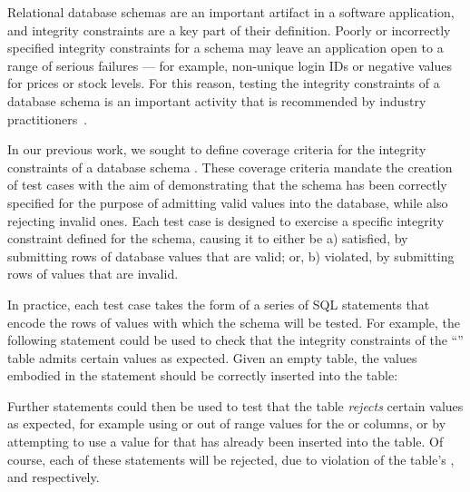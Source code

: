 Relational database schemas are an important artifact in a software application, and integrity constraints are a key part of their definition. Poorly or incorrectly specified integrity constraints for a schema may leave an application open to a range of serious failures --- for example, non-unique login IDs or negative values for prices or stock levels. For this reason, testing the integrity constraints of a database schema is an important activity that is recommended by industry practitioners~\cite{DzoneDatabaseTesting}.

In our previous work, we sought to define coverage criteria for the integrity constraints of a database schema \cite{McMinn2015}. These coverage criteria mandate the creation of test cases with the aim of demonstrating that the schema has been correctly specified for the purpose of admitting valid values into the database, while also rejecting \mbox{invalid} ones. Each test case is designed to exercise a specific integrity constraint defined for the schema, causing it to either be a) satisfied, by submitting rows of database values that are valid; or, b) violated, by submitting rows of values that are invalid.

In practice, each test case takes the form of a series of SQL \INSERT statements that encode the rows of values with which the schema will be tested. For example, the following \INSERT statement could be used to check that the integrity constraints of the ``'' table admits certain values as expected. Given an empty table, the values embodied in the statement should be correctly inserted into the table:

\vspace{-.25em}
\begin{center}
\end{center}
\vspace{-.25em}

Further \INSERT statements could then be used to test that the table {\it rejects} certain values as expected, for example using \NULL or out of range values for the  or  columns, or by attempting to use a value for  that has already been inserted into the table. Of course, each of these \INSERT statements will be rejected, due to violation of the table's \NOTNULL, \CHECK and \PKCs respectively.

